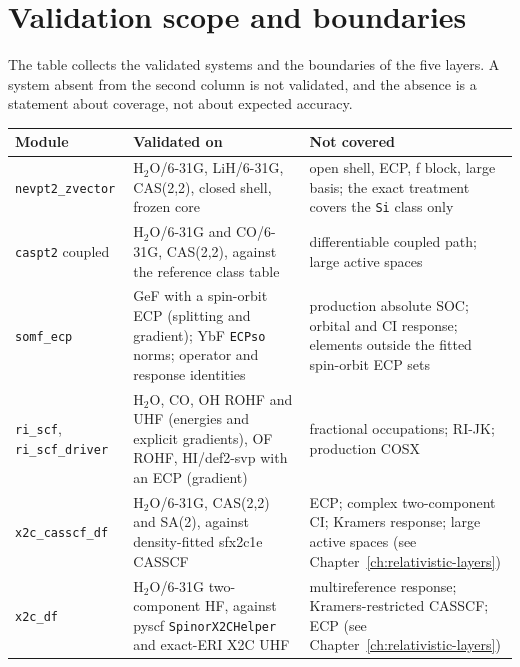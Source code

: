 \section{Validation scope and boundaries}
\label{sec:new-scope}

The table collects the validated systems and the boundaries of the five
layers.  A system absent from the second column is not validated, and
the absence is a statement about coverage, not about expected accuracy.

\begin{center}
\begin{tabularx}{\textwidth}{>{\raggedright\arraybackslash}p{}>{\raggedright\arraybackslash}p{}X}
\toprule
Module & Validated on & Not covered \\
\midrule
\texttt{nevpt2\_zvector} &
  H$_2$O/6-31G, LiH/6-31G, CAS(2,2), closed shell, frozen core &
  open shell, ECP, f block, large basis; the exact treatment covers the
  \texttt{Si} class only \\
\texttt{caspt2} coupled &
  H$_2$O/6-31G and CO/6-31G, CAS(2,2), against the reference class
  table &
  differentiable coupled path; large active spaces \\
\texttt{somf\_ecp} &
  GeF with a spin-orbit ECP (splitting and gradient); YbF
  \texttt{ECPso} norms; operator and response identities &
  production absolute SOC; orbital and CI response; elements outside
  the fitted spin-orbit ECP sets \\
\texttt{ri\_scf}, \texttt{ri\_scf\_driver} &
  H$_2$O, CO, OH ROHF and UHF (energies and explicit gradients), OF
  ROHF, HI/def2-svp with an ECP (gradient) &
  fractional occupations; RI-JK; production COSX \\
\texttt{x2c\_casscf\_df} &
  H$_2$O/6-31G, CAS(2,2) and SA(2), against density-fitted sfx2c1e
  CASSCF &
  ECP; complex two-component CI; Kramers response; large active spaces
  (see Chapter~\ref{ch:relativistic-layers}) \\
\texttt{x2c\_df} &
  H$_2$O/6-31G two-component HF, against pyscf \texttt{SpinorX2CHelper}
  and exact-ERI X2C UHF &
  multireference response; Kramers-restricted CASSCF; ECP
  (see Chapter~\ref{ch:relativistic-layers}) \\
\bottomrule
\end{tabularx}
\end{center}
